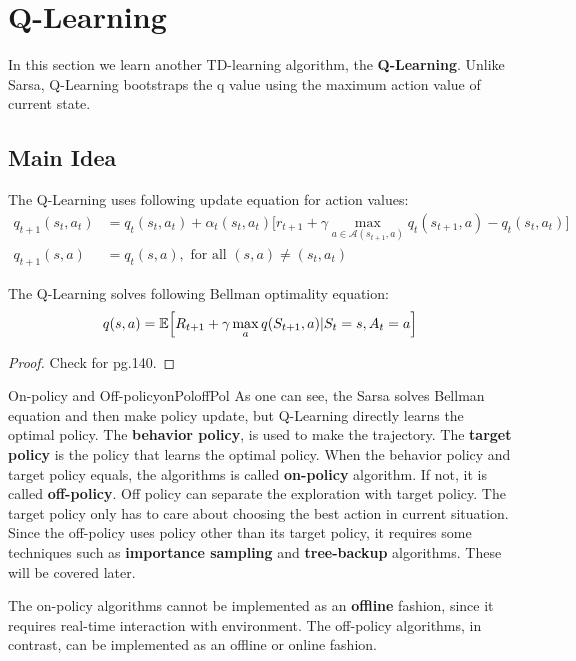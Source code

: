\section{Q-Learning}
    In this section we learn another TD-learning algorithm, the \textbf{Q-Learning}.
    Unlike Sarsa, Q-Learning bootstraps the q value using the maximum action value of current state.
    \subsection{Main Idea}
        The Q-Learning uses following update equation for action values:
        \begin{align}
            q_{t+1}(s_t,a_t) &= q_t(s_t,a_t) + \alpha_t(s_t,a_t)\Big[ r_{t+1} + \gamma \max_{a \in \mathcal{A}(s_{t+1},a)}{q_t(s_{t+1},a)} - q_t(s_t,a_t) \Big] \\
            q_{t+1}(s,a) &= q_t(s,a),\text{ for all }(s,a) \neq (s_t,a_t)
        \end{align}

        The Q-Learning solves following Bellman optimality equation:
        \begin{equation}
            q(s,a) = \mathbb{E}\Big[ R_{t+1} + \gamma \max_aq(S_{t+1},a)|S_t=s,A_t=a \Big]
        \end{equation}
        \begin{proof}
            Check for \cite{Zhao2025} pg.140.
        \end{proof}

        \begin{rem}{On-policy and Off-policy}{onPoloffPol}
            As one can see, the Sarsa solves Bellman equation and then make policy update, but Q-Learning directly learns the optimal policy.
            The \textbf{behavior policy}, is used to make the trajectory. The \textbf{target policy} is the policy that learns the optimal policy.
            When the behavior policy and target policy equals, the algorithms is called \textbf{on-policy} algorithm. If not, it is called \textbf{off-policy}.
            Off policy can separate the exploration with target policy. The target policy only has to care about choosing the best action in current situation.
            Since the off-policy uses policy other than its target policy, it requires some techniques such as \textbf{importance sampling} and \textbf{tree-backup} algorithms.
            These will be covered later.
            
            The on-policy algorithms cannot be implemented as an \textbf{offline} fashion, since it requires real-time interaction with environment.
            The off-policy algorithms, in contrast, can be implemented as an offline or online fashion.
        \end{rem}

